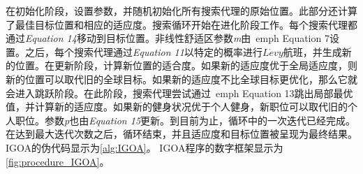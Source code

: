 在初始化阶段，设置参数，并随机初始化所有搜索代理的原始位置。此部分还计算了最佳目标位置和相应的适应度。搜索循环开始在进化阶段工作。每个搜索代理都通过\emph{Equation 14}移动到目标位置。非线性舒适区参数\emph{m}由\ emph {Equation 7}设置。之后，每个搜索代理通过\emph{Equation 11}以特定的概率进行$ L\acute{e}vy $航班，并生成新的位置。在更新阶段，计算新位置的适合度。如果新的适应度优于全局适应度，则新的位置可以取代旧的全球目标。如果新的适应度不比全球目标更优化，那么它就会进入跳跃阶段。在此阶段，搜索代理尝试通过\ emph {Equation 13}跳出局部最优值，并计算新的适应度。如果新的健身状况优于个人健身，新职位可以取代旧的个人职位。参数\emph{p}也由\emph{Equation 15}更新。到目前为止，循环中的一次迭代已经完成。在达到最大迭代次数之后，循环结束，并且适应度和目标位置被呈现为最终结果。 IGOA的伪代码显示为\ref{alg:IGOA}。 IGOA程序的数字框架显示为\ref{fig:procedure_IGOA}。
